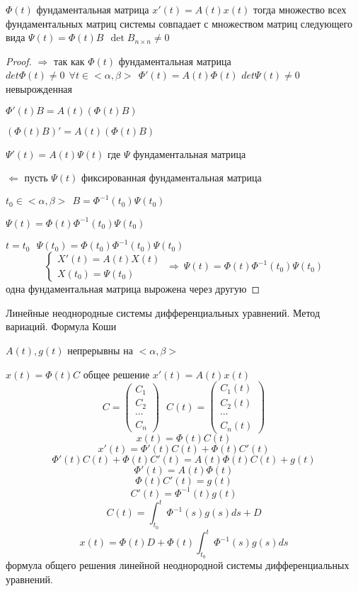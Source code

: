 \begin{theorem}
  $\Phi(t)$ фундаментальная матрица $x'(t) = A(t)x(t)$ тогда множество всех
  фундаментальных матриц системы совпадает с множеством матриц следующего вида
  $\Psi(t) = \Phi(t)B ~~ \det B_{n \times n} \not= 0$
\end{theorem}

\begin{proof}
  $\Rightarrow$ так как $\Phi(t)$ фундаментальная матрица $det\Phi(t) \not= 0 ~~
  \forall t \in <\alpha, \beta> ~~ \Phi'(t) = A(t)\Phi(t)$
  $det\Psi(t) \not= 0$ невырожденная

  $\Phi'(t)B = A(t)(\Phi(t)B)$

  $(\Phi(t)B)' = A(t)(\Phi(t)B)$

  $\Psi'(t) = A(t)\Psi(t)$ где $\Psi$ фундаментальная матрица

  $\Leftarrow$ пусть $\Psi(t)$ фиксированная фундаментальная матрица

  $t_0 \in <\alpha, \beta> ~~ B = \Phi^{-1}(t_0) \Psi(t_0)$

  $\Psi(t) = \Phi(t) \Phi^{-1}(t_0) \Psi(t_0)$

  $t = t_0 ~~~ \Psi(t_0) = \Phi(t_0) \Phi^{-1}(t_0) \Psi(t_0)$
  $$
  \left\{
  \begin{array}{l}
    X'(t) = A(t)X(t) \\
    X(t_0) = \Psi(t_0)
  \end{array}
  \right. ~ \Rightarrow ~
  \Psi(t) = \Phi(t) \Phi^{-1}(t_0)\Psi(t_0)
  $$
  одна фундаментальная матрица вырожена через другую
\end{proof}

\begin{title}[\Large]
  Линейные неоднородные системы дифференциальных уравнений. Метод вариаций.
  Формула Коши
\end{title}

\begin{block}
  $A(t), g(t)$ непрерывны на $<\alpha, \beta>$

  $x(t) = \Phi(t) C$ общее решение $x'(t) = A(t)x(t)$
  $$
  C =
  \left(
  \begin{array}{c}
    C_1 \\
    C_2 \\
    \cdots \\
    C_n
  \end{array}
  \right) ~~~
  C(t) =
  \left(
  \begin{array}{c}
    C_1(t) \\
    C_2(t) \\
    \cdots \\
    C_n(t)
  \end{array}
  \right)
  $$
  $$
  x(t) = \Phi(t)C(t)
  $$
  $$
  x'(t) = \Phi'(t)C(t) + \Phi(t)C'(t)
  $$
  $$
  \Phi'(t)C(t) + \Phi(t)C'(t) = A(t)\Phi(t)C(t) + g(t)
  $$
  $$
  \Phi'(t) = A(t) \Phi(t)
  $$
  $$
  \Phi(t)C'(t) = g(t)
  $$
  $$
  C'(t) = \Phi^{-1}(t)g(t)
  $$
  $$
  C(t) = \int_{t_0}^t \Phi^{-1}(s)g(s)ds + D
  $$
  $$
  x(t) = \Phi(t)D + \Phi(t)\int_{t_0}^t\Phi^{-1}(s)g(s)ds
  $$
  формула общего решения линейной неоднородной системы дифференциальных
  уравнений.
\end{block}

